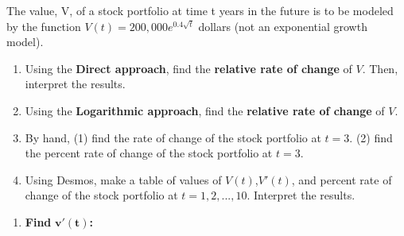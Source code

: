\begin{example}
The value, V, of a stock portfolio at time t years in the future is to be modeled by the function $V(t)=200,000e^{0.4\sqrt{t}}$ dollars (not an exponential growth model).  
\newpage
\renewcommand{\labelenumi}{\textbf{(\alph{enumi})}}
\begin{enumerate}[leftmargin=*]
    \item Using the \textbf{Direct approach}, find the \textbf{relative rate of change} of $V$. Then, interpret the results. \vspace{2in}
    \item Using the \textbf{Logarithmic approach}, find the \textbf{relative rate of change} of $V$. \vspace{2in}
    \item By hand, (1) find the rate of change of the stock portfolio at $t=3$. (2) find the percent rate of change of the stock portfolio at $t=3$.\vspace{1.5in}
    \item Using Desmos, make a table of values of $V(t)$,$V'(t)$, and percent rate of change of the stock portfolio at $t=1,2,...,10$.  Interpret the results.\vspace*{0.1in}
\end{enumerate}
    \begin{sol}
    \end{sol}
    \begin{solL}
    \hfill 
    \renewcommand{\labelenumi}{\textbf{(\alph{enumi})}}
\begin{enumerate}[leftmargin=*]
    \item \hfill 
    \newline 
    \textbf{Find} $\bm{v'(t)}$\textbf{:}

\end{enumerate}
\end{solL}
\end{example}
